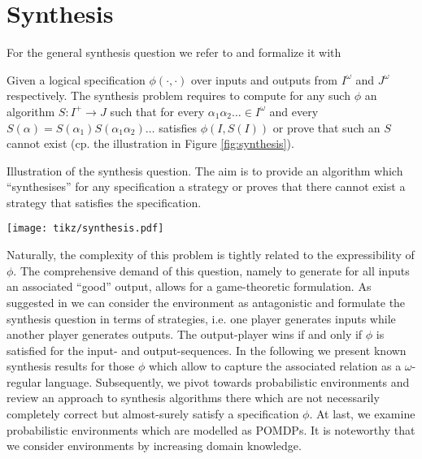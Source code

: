 \chapter{Synthesis}
\label{chapter:synthesis}
For the general synthesis question we refer to \cite{Church} and formalize it
with 
\begin{definition}
  Given a logical specification  $\phi(\cdot, \cdot)$ over inputs and 
  outputs from $I^{\omega}$ and $J^{\omega}$ respectively. The synthesis 
  problem requires to compute for any such $\phi$ an algorithm 
  $S:I^{+}\rightarrow J$ such that for every 
  $\alpha_{1}\alpha_{2}\dots\in I^{\omega}$ and every 
  $S(\alpha) = S(\alpha_{1})S(\alpha_{1}\alpha_{2})\dots$ satisfies 
  $\phi(I, S(I))$ or prove that such an $S$ cannot exist (cp. the 
  illustration in Figure \ref{fig:synthesis}).
\end{definition}
\begin{drawing}
  \caption{Illustration of the synthesis question. The aim is to provide an 
  algorithm which \enquote{synthesises} for any specification a strategy or 
  proves that there cannot exist a strategy that satisfies the specification.}
  \label{fig:synthesis}
  \begin{center}
    \texttt{[image: tikz/synthesis.pdf]}
  \end{center}
\end{drawing}
Naturally, the complexity of this problem is tightly related to the 
expressibility of $\phi$. The comprehensive demand of this question, namely
to generate for all inputs an associated \enquote{good} output, allows for a
game-theoretic formulation. As suggested in \cite{SeqCondStrat} we can consider
the environment as antagonistic and formulate the synthesis question in terms
of strategies, i.e. one player generates inputs while another player generates
outputs. The output-player wins if and only if $\phi$ is satisfied for the
input- and output-sequences. In the following we present known synthesis results 
for those $\phi$ which allow to capture the associated relation as a
$\omega$-regular language. Subsequently, we pivot towards probabilistic 
environments and review an approach to synthesis algorithms there which are not
necessarily completely correct but almost-surely satisfy a specification 
$\phi$. At last, we examine probabilistic environments which are modelled as
\acp{POMDP}. It is noteworthy that we consider environments by increasing 
domain knowledge.

